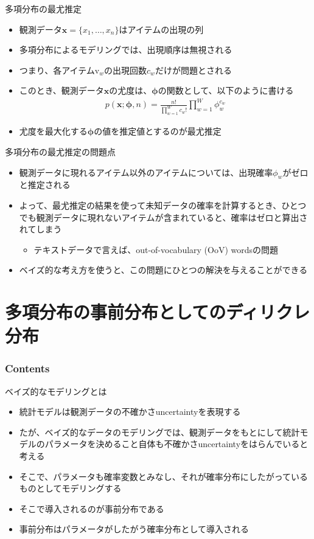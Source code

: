 \documentclass[aspectratio=169,unicode,dvipdfmx,14pt]{beamer}
\begin{document}
\begin{frame}{多項分布の最尤推定}
\begin{itemize}
\item 観測データ$\bm{x}=\{x_1,\ldots,x_n\}$はアイテムの出現の列
\item 多項分布によるモデリングでは、出現順序は無視される
\item つまり、各アイテム$\mbox{v}_w$の出現回数$c_w$だけが問題とされる
\item このとき、観測データ$\bm{x}$の尤度は、$\bm{\phi}$の関数として、以下のように書ける
\begin{align}
p(\bm{x};\bm{\phi},n)=\frac{n!}{\prod_{w=1}^W c_w!}\prod_{w=1}^W\phi_w^{c_w}
\end{align}
\item 尤度を最大化する$\bm{\phi}$の値を推定値とするのが最尤推定
\end{itemize}
\end{frame}

\begin{frame}{多項分布の最尤推定の問題点}
\begin{itemize}
\item 観測データに現れるアイテム以外のアイテムについては、出現確率$\phi_w$がゼロと推定される
\item よって、最尤推定の結果を使って未知データの確率を計算するとき、ひとつでも観測データに現れないアイテムが含まれていると、確率はゼロと算出されてしまう
\begin{itemize}
\item テキストデータで言えば、out-of-vocabulary (OoV) wordsの問題
\end{itemize}
\item ベイズ的な考え方を使うと、この問題にひとつの解決を与えることができる
\end{itemize}
\end{frame}


\section{多項分布の事前分布としてのディリクレ分布}

\begin{frame}\frametitle{Contents}
\Large \tableofcontents[currentsection]
\end{frame}

\begin{frame}{ベイズ的なモデリングとは}
\begin{itemize}
\item 統計モデルは観測データの不確かさuncertaintyを表現する
\item たが、ベイズ的なデータのモデリングでは、観測データをもとにして統計モデルのパラメータを決めること自体も不確かさuncertaintyをはらんでいると考える
\item そこで、パラメータも確率変数とみなし、それが確率分布にしたがっているものとしてモデリングする
\item そこで導入されるのが事前分布である
\item 事前分布はパラメータがしたがう確率分布として導入される
\end{itemize}
\end{frame}
\end{document}
